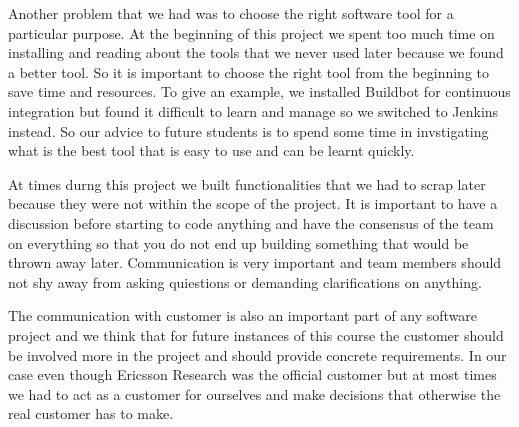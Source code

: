 Another problem that we had was to choose the right software tool for a particular purpose. At the beginning of this project we spent too much time on installing and reading about the tools that we never used later because we found a better tool. So it is important to choose the right tool from the beginning to save time and resources. To give an example, we installed Buildbot for continuous integration but found it difficult to learn and manage so we switched to Jenkins instead. So our advice to future students is to spend some time in invstigating what is the best tool that is easy to use and can be learnt quickly.          

 At times durng this project we built functionalities that we had to scrap later because they were not within the scope of the project. It is important to have a discussion before starting to code anything and have the consensus of the team on everything so that you do not end up building something that would be thrown away later. Communication is very important and team members should not shy away from asking quiestions or demanding clarifications on anything.  
 
The communication with customer is also an important part of any software project and we think that for future instances of this course the customer should be involved more in the project and should provide concrete requirements. In our case even though Ericsson Research was the official customer but at most times we had to act as a customer for ourselves and make decisions that otherwise the real customer has to make. 
